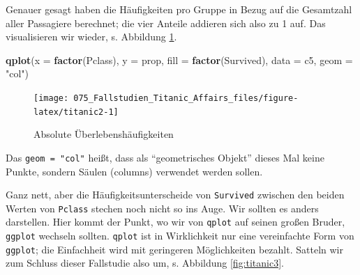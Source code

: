 \documentclass[12pt,ngerman,]{book}
\makeatletter
\newenvironment{Shaded}{\begin{snugshade}}{\end{snugshade}}
\newcommand{\KeywordTok}[1]{\textcolor[rgb]{0.13,0.29,0.53}{\textbf{#1}}}
\newcommand{\DataTypeTok}[1]{\textcolor[rgb]{0.13,0.29,0.53}{#1}}
\newcommand{\DecValTok}[1]{\textcolor[rgb]{0.00,0.00,0.81}{#1}}
\newcommand{\StringTok}[1]{\textcolor[rgb]{0.31,0.60,0.02}{#1}}
\newcommand{\CommentTok}[1]{\textcolor[rgb]{0.56,0.35,0.01}{\textit{#1}}}
\newcommand{\OperatorTok}[1]{\textcolor[rgb]{0.81,0.36,0.00}{\textbf{#1}}}
\newcommand{\NormalTok}[1]{#1}
\newenvironment{kframe}{%
\medskip{}
\setlength{\fboxsep}{.8em}
 \def\at@end@of@kframe{}%
 \ifinner\ifhmode%
  \def\at@end@of@kframe{\end{minipage}}%
  \begin{minipage}{\columnwidth}%
 \fi\fi%
 \def\FrameCommand##1{\hskip\@totalleftmargin \hskip-\fboxsep
 \colorbox{shadecolor}{##1}\hskip-\fboxsep
     \hskip-\linewidth \hskip-\@totalleftmargin \hskip\columnwidth}%
 \MakeFramed {\advance\hsize-\width
   \@totalleftmargin\z@ \linewidth\hsize
   \@setminipage}}%
 {\par\unskip\endMakeFramed%
 \at@end@of@kframe}
\renewenvironment{Shaded}{\begin{kframe}}{\end{kframe}}
\theoremstyle{definition}
\theoremstyle{definition}
\theoremstyle{remark}
\makeatother
\begin{document}
\begin{Shaded}
\end{Shaded}

Genauer gesagt haben die Häufigkeiten pro Gruppe in Bezug auf die
Gesamtzahl aller Passagiere berechnet; die vier Anteile addieren sich
also zu 1 auf. Das visualisieren wir wieder, s. Abbildung
\ref{fig:titanic2}.

\begin{Shaded}
\begin{Highlighting}[]
\KeywordTok{qplot}\NormalTok{(}\DataTypeTok{x =} \KeywordTok{factor}\NormalTok{(Pclass), }
      \DataTypeTok{y =}\NormalTok{ prop, }
      \DataTypeTok{fill =} \KeywordTok{factor}\NormalTok{(Survived), }
      \DataTypeTok{data =}\NormalTok{ c5, }
      \DataTypeTok{geom =} \StringTok{"col"}\NormalTok{)}
\end{Highlighting}
\end{Shaded}

\begin{figure}

{\centering \texttt{[image: 075\_Fallstudien\_Titanic\_Affairs\_files/figure-latex/titanic2-1]} 

}

\caption{Absolute Überlebenshäufigkeiten}\label{fig:titanic2}
\end{figure}

Das \texttt{geom\ =\ "col"} heißt, dass als ``geometrisches Objekt''
dieses Mal keine Punkte, sondern Säulen (columns) verwendet werden
sollen.

Ganz nett, aber die Häufigkeitsunterscheide von \texttt{Survived}
zwischen den beiden Werten von \texttt{Pclass} stechen noch nicht so ins
Auge. Wir sollten es anders darstellen. Hier kommt der Punkt, wo wir von
\texttt{qplot} auf seinen großen Bruder, \texttt{ggplot} wechseln
sollten. \texttt{qplot} ist in Wirklichkeit nur eine vereinfachte Form
von \texttt{ggplot}; die Einfachheit wird mit geringeren Möglichkeiten
bezahlt. Satteln wir zum Schluss dieser Fallstudie also um, s. Abbildung
\ref{fig:titanic3}.
\end{document}
